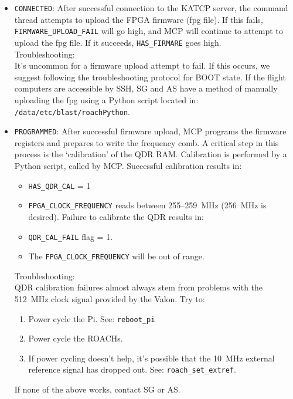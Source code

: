 \begin{itemize}[leftmargin=*,label={}]
\begin{itemize}
\item \texttt{CONNECTED}: After successful connection to the KATCP server, the command thread attempts to upload the FPGA firmware (fpg file). If this fails, \texttt{FIRMWARE\_UPLOAD\_FAIL} will go high, and MCP will continue to attempt to upload the fpg file. If it succeeds, \texttt{HAS\_FIRMARE} goes high.\\
Troubleshooting:\\
It’s uncommon for a firmware upload attempt to fail. If this occurs, we suggest following the troubleshooting protocol for BOOT state. If the flight computers are accessible by SSH, SG and AS have a method of manually uploading the fpg using a Python script located in: \texttt{/data/etc/blast/roachPython}.

\item \texttt{PROGRAMMED}: After successful firmware upload, MCP programs the firmware registers and prepares to write the frequency comb. A critical step in this process is the ‘calibration’ of the QDR RAM\@. Calibration is performed by a Python script, called by MCP\@. Successful calibration results in:
\begin{itemize}
  \item \texttt{HAS\_QDR\_CAL} = 1
  \item \texttt{FPGA\_CLOCK\_FREQUENCY} reads between 255--259~MHz (256~MHz is desired).
  Failure to calibrate the QDR results in:
  \item \texttt{QDR\_CAL\_FAIL} flag = 1.
  \item The \texttt{FPGA\_CLOCK\_FREQUENCY} will be out of range.
\end{itemize}
Troubleshooting:\\
QDR calibration failures almost always stem from problems with the 512~MHz clock signal provided by the Valon. Try to:
\begin{enumerate}
  \item Power cycle the Pi. See: \texttt{reboot\_pi}
  \item Power cycle the ROACHs.
  \item If power cycling doesn’t help, it’s possible that the 10~MHz external reference signal has dropped out. See: \texttt{roach\_set\_extref}.
\end{enumerate}
If none of the above works, contact SG or AS\@.


\end{itemize}
\end{itemize}
